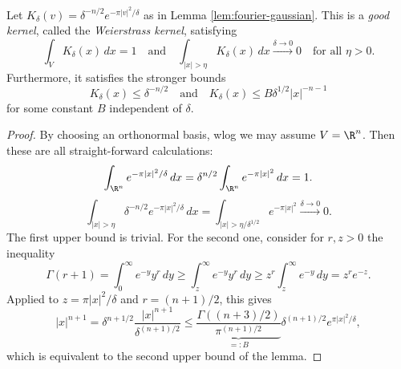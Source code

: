 \begin{lemma}
\label{lem:weierstrass-kernel}
\uses{}
\lean{}
Let $K_\delta(v)=\delta^{-n/2}e^{-\pi|v|^2/\delta}$
as in Lemma \ref{lem:fourier-gaussian}. This is a
\emph{good kernel}, called the \emph{Weierstrass kernel}, satisfying
$$\int_{V}K_\delta(x)\,dx= 1\quad\text{and}\quad
\int_{|x|>\eta}K_\delta(x)\,dx\xrightarrow{\delta\to0}0\quad\text{for all }\eta>0.$$
Furthermore, it satisfies the stronger bounds
$$K_\delta(x)\leq \delta^{-n/2}\quad\text{and}\quad K_\delta(x)\leq B\delta^{1/2}|x|^{-n-1}$$ for
some constant $B$ independent of $\delta$.
\end{lemma}
\begin{proof}
  By choosing an orthonormal basis, wlog we may assume $V=\R^n$. Then these are all straight-forward calculations:
  $$\int_{\R^n}e^{-\pi|x|^2/\delta}\,dx=\delta^{n/2}\int_{\R^n}e^{-\pi|x|^2}\,dx=1.$$
  $$\int_{|x|>\eta}\delta^{-n/2}e^{-\pi|x|^2/\delta}\,dx=\int_{|x|>\eta/\delta^{1/2}}e^{-\pi|x|^2}\xrightarrow{\delta\to0}0.$$
  The first upper bound is trivial. For the second one, consider for $r,z>0$ the inequality
  $$\Gamma(r+1)=\int_0^\infty e^{-y}y^r\,dy\geq\int_z^\infty e^{-y}y^r\,dy\geq z^r\int_z^\infty e^{-y}\,dy=z^re^{-z}.$$
  Applied to $z=\pi|x|^2/\delta$ and $r=(n+1)/2$, this gives
  $$|x|^{n+1}=\delta^{n+1/2}\frac{|x|^{n+1}}{\delta^{(n+1)/2}}\leq
  \underbrace{\frac{\Gamma((n+3)/2)}{\pi^{(n+1)/2}}}_{=:B}\delta^{(n+1)/2}e^{\pi|x|^2/\delta},$$
  which is equivalent to the second upper bound of the lemma.
\end{proof}

